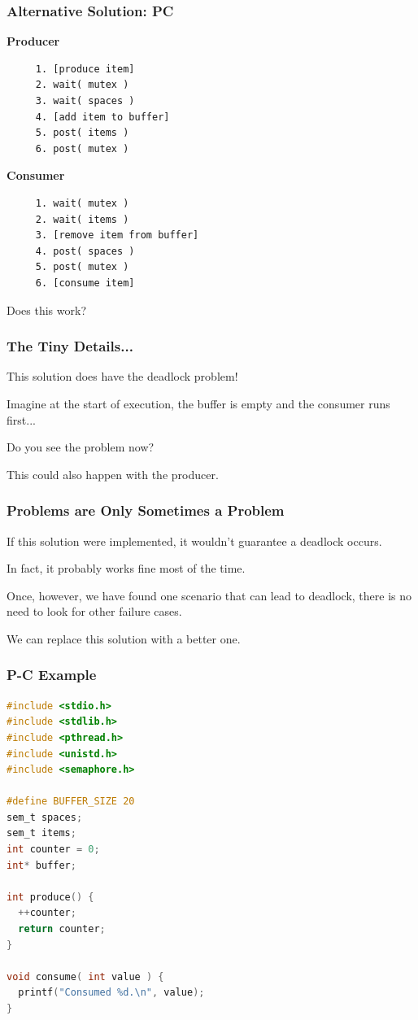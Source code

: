 \begin{frame}[fragile]
	\frametitle{Alternative Solution: PC}

	\begin{multicols}{2}
		\textbf{Producer}
		\begin{verbatim}
	 1. [produce item]
	 2. wait( mutex )
	 3. wait( spaces )
	 4. [add item to buffer]
	 5. post( items )
	 6. post( mutex )
  \end{verbatim}
		\columnbreak
		\textbf{Consumer}
		\begin{verbatim}
	 1. wait( mutex )
	 2. wait( items )
	 3. [remove item from buffer]
	 4. post( spaces )
	 5. post( mutex )
	 6. [consume item]
  \end{verbatim}
	\end{multicols}
	\vspace{-2em}

	Does this work?

\end{frame}

\begin{frame}
	\frametitle{The Tiny Details...}

	This solution does have the deadlock problem!

	Imagine at the start of execution, the buffer is empty and the consumer runs first...

	Do you see the problem now?

	This could also happen with the producer.

\end{frame}

\begin{frame}
	\frametitle{Problems are Only Sometimes a Problem}

	If this solution were implemented, it wouldn't guarantee a deadlock occurs.

	In fact, it probably works fine most of the time.


	Once, however, we have found one scenario that can lead to deadlock, there is no need to look for other failure cases.

	We can replace this solution with a better one.

\end{frame}


\begin{frame}[fragile]
	\frametitle{P-C Example}

	\begin{lstlisting}[language=C]
#include <stdio.h>
#include <stdlib.h>
#include <pthread.h>
#include <unistd.h>
#include <semaphore.h>

#define BUFFER_SIZE 20
sem_t spaces;
sem_t items;
int counter = 0;
int* buffer;

int produce() {
  ++counter;
  return counter;
} 

void consume( int value ) {
  printf("Consumed %d.\n", value);
}
\end{lstlisting}

\end{frame}

